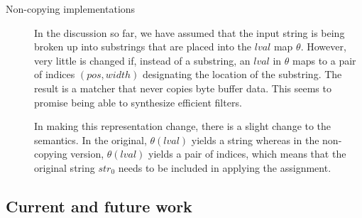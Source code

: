 \documentclass[sigplan,10pt,anonymous,review]{acmart}\settopmatter{printfolios=true,printccs=false,printacmref=false}
\newcommand{\lval}{\ensuremath{\mathit{lval}}}
\begin{document}
\begin{description}
\item [Non-copying implementations] In the discussion so far, we have
  assumed that the input string is being broken up into substrings
  that are placed into the \lval{} map $\theta$. However, very little
  is changed if, instead of a substring, an \lval{} in $\theta$ maps
  to a pair of indices $(\mathit{pos},\mathit{width})$ designating the
  location of the substring. The result is a matcher that never copies
  byte buffer data. This seems to promise being able to synthesize
  efficient filters.

  In making this representation change, there is a slight change to
  the semantics. In the original, $\theta(\lval)$ yields a string
  whereas in the non-copying version, $\theta(\lval)$ yields a pair of
  indices, which means that the original string $\mathit{str}_0$ needs
  to be included in applying the assignment.
\end{description}

\subsection{Current and future work}
\end{document}
